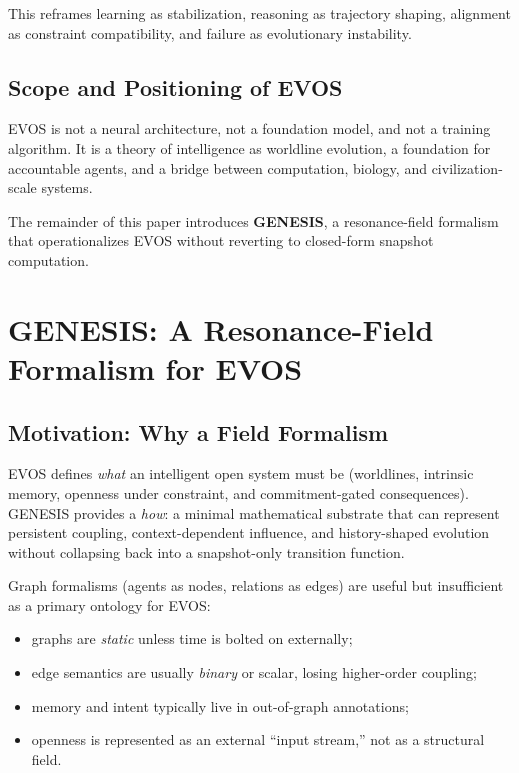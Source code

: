 \documentclass[11pt]{article}
\begin{document}
This reframes learning as stabilization, reasoning as trajectory shaping, alignment as
constraint compatibility, and failure as evolutionary instability.

\vspace{0.75em}
\subsection{Scope and Positioning of EVOS}

EVOS is not a neural architecture, not a foundation model, and not a training algorithm.
It is a theory of intelligence as worldline evolution, a foundation for accountable
agents, and a bridge between computation, biology, and civilization-scale systems.

The remainder of this paper introduces \textbf{GENESIS}, a resonance-field formalism that
operationalizes EVOS without reverting to closed-form snapshot computation.

\vspace{0.75em}
\section{GENESIS: A Resonance-Field Formalism for EVOS}

\subsection{Motivation: Why a Field Formalism}

EVOS defines \emph{what} an intelligent open system must be (worldlines, intrinsic memory,
openness under constraint, and commitment-gated consequences). GENESIS provides a
\emph{how}: a minimal mathematical substrate that can represent persistent coupling,
context-dependent influence, and history-shaped evolution without collapsing back into a
snapshot-only transition function.

Graph formalisms (agents as nodes, relations as edges) are useful but insufficient as a
primary ontology for EVOS:
\begin{itemize}
  \item graphs are \emph{static} unless time is bolted on externally;
  \item edge semantics are usually \emph{binary} or scalar, losing higher-order coupling;
  \item memory and intent typically live in out-of-graph annotations;
  \item openness is represented as an external ``input stream,'' not as a structural field.
\end{itemize}
\end{document}
